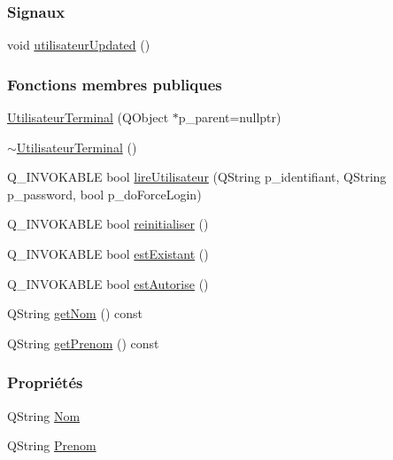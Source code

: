 \subsubsection*{Signaux}
\begin{DoxyCompactItemize}
\item 
void \hyperlink{class_utilisateur_terminal_ade3153552e04d348ddb5c1ebdb95450a}{utilisateur\+Updated} ()
\end{DoxyCompactItemize}
\subsubsection*{Fonctions membres publiques}
\begin{DoxyCompactItemize}
\item 
\hyperlink{class_utilisateur_terminal_a3a4e47b0f67f67f2396671941688d036}{Utilisateur\+Terminal} (Q\+Object $\ast$p\+\_\+parent=nullptr)
\item 
\hyperlink{class_utilisateur_terminal_a4042df79027924a5dd0181756687b89b}{$\sim$\+Utilisateur\+Terminal} ()
\item 
Q\+\_\+\+I\+N\+V\+O\+K\+A\+B\+LE bool \hyperlink{class_utilisateur_terminal_a196420ecc14bc0645e3e1c66d796b8e6}{lire\+Utilisateur} (Q\+String p\+\_\+identifiant, Q\+String p\+\_\+password, bool p\+\_\+do\+Force\+Login)
\item 
Q\+\_\+\+I\+N\+V\+O\+K\+A\+B\+LE bool \hyperlink{class_utilisateur_terminal_a63b37fa7cbf08976e5a09cbfbdb55f42}{reinitialiser} ()
\item 
Q\+\_\+\+I\+N\+V\+O\+K\+A\+B\+LE bool \hyperlink{class_utilisateur_terminal_aa80e532db6a898bf1aa433ffb34f2389}{est\+Existant} ()
\item 
Q\+\_\+\+I\+N\+V\+O\+K\+A\+B\+LE bool \hyperlink{class_utilisateur_terminal_a6cd16c268f5ab545fc2b62f1e29a9917}{est\+Autorise} ()
\item 
Q\+String \hyperlink{class_utilisateur_terminal_a6432e5c3b9a732ef9312f67718648bf1}{get\+Nom} () const
\item 
Q\+String \hyperlink{class_utilisateur_terminal_ac38fe2414a0dcb53d0f283f231dcba01}{get\+Prenom} () const
\end{DoxyCompactItemize}
\subsubsection*{Propriétés}
\begin{DoxyCompactItemize}
\item 
Q\+String \hyperlink{class_utilisateur_terminal_a92c24246effeafa1a9ea0923f13c20e8}{Nom}
\item 
Q\+String \hyperlink{class_utilisateur_terminal_a42d3d48105b486ce0fd89bcef40f8573}{Prenom}
\end{DoxyCompactItemize}
